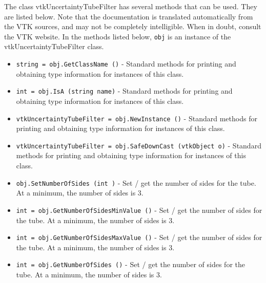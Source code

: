 The class vtkUncertaintyTubeFilter has several methods that can be used.
  They are listed below.
Note that the documentation is translated automatically from the VTK sources,
and may not be completely intelligible.  When in doubt, consult the VTK website.
In the methods listed below, \verb|obj| is an instance of the vtkUncertaintyTubeFilter class.
\begin{itemize}
\item  \verb|string = obj.GetClassName ()| -  Standard methods for printing and obtaining type information for instances of this class.

\item  \verb|int = obj.IsA (string name)| -  Standard methods for printing and obtaining type information for instances of this class.

\item  \verb|vtkUncertaintyTubeFilter = obj.NewInstance ()| -  Standard methods for printing and obtaining type information for instances of this class.

\item  \verb|vtkUncertaintyTubeFilter = obj.SafeDownCast (vtkObject o)| -  Standard methods for printing and obtaining type information for instances of this class.

\item  \verb|obj.SetNumberOfSides (int )| -  Set / get the number of sides for the tube. At a minimum,
 the number of sides is 3.

\item  \verb|int = obj.GetNumberOfSidesMinValue ()| -  Set / get the number of sides for the tube. At a minimum,
 the number of sides is 3.

\item  \verb|int = obj.GetNumberOfSidesMaxValue ()| -  Set / get the number of sides for the tube. At a minimum,
 the number of sides is 3.

\item  \verb|int = obj.GetNumberOfSides ()| -  Set / get the number of sides for the tube. At a minimum,
 the number of sides is 3.

\end{itemize}
